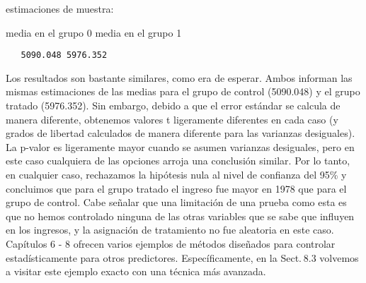 \documentclass[
]{book}
\begin{document}
estimaciones de muestra:

media en el grupo 0 media en el grupo 1

\begin{verbatim}
   5090.048 5976.352
\end{verbatim}

Los resultados son bastante similares, como era de esperar. Ambos informan las mismas estimaciones de las medias para el grupo de control (5090.048) y el grupo tratado (5976.352). Sin embargo, debido a que el error estándar se calcula de manera diferente, obtenemos valores t ligeramente diferentes en cada caso (y grados de libertad calculados de manera diferente para las varianzas desiguales). La p-valor es ligeramente mayor cuando se asumen varianzas desiguales, pero en este caso cualquiera de las opciones arroja una conclusión similar. Por lo tanto, en cualquier caso, rechazamos la hipótesis nula al nivel de confianza del 95\% y concluimos que para el grupo tratado el ingreso fue mayor en 1978 que para el grupo de control. Cabe señalar que una limitación de una prueba como esta es que no hemos controlado ninguna de las otras variables que se sabe que influyen en los ingresos, y la asignación de tratamiento no fue aleatoria en este caso. Capítulos 6 - 8 ofrecen varios ejemplos de métodos diseñados para controlar estadísticamente para otros predictores. Específicamente, en la Sect. 8.3 volvemos a visitar este ejemplo exacto con una técnica más avanzada.
\end{document}
